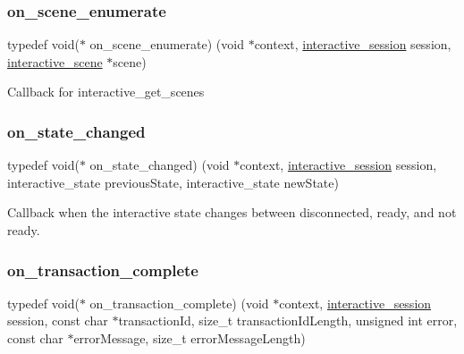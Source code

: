 \subsubsection{\texorpdfstring{on\+\_\+scene\+\_\+enumerate}{on\_scene\_enumerate}}
{\footnotesize\ttfamily typedef void($\ast$ on\+\_\+scene\+\_\+enumerate) (void $\ast$context, \mbox{\hyperlink{group___interactivity_ga6d8819d38b8dc8994a2299cf22a65a31}{interactive\+\_\+session}} session, \mbox{\hyperlink{structinteractive__scene}{interactive\+\_\+scene}} $\ast$scene)}



Callback for {\ttfamily interactive\+\_\+get\+\_\+scenes} 

\mbox{\label{group___interactivity_ga2decafcde365ca3bc6907760ef4fcc5f}} 
\subsubsection{\texorpdfstring{on\+\_\+state\+\_\+changed}{on\_state\_changed}}
{\footnotesize\ttfamily typedef void($\ast$ on\+\_\+state\+\_\+changed) (void $\ast$context, \mbox{\hyperlink{group___interactivity_ga6d8819d38b8dc8994a2299cf22a65a31}{interactive\+\_\+session}} session, interactive\+\_\+state previous\+State, interactive\+\_\+state new\+State)}



Callback when the interactive state changes between disconnected, ready, and not ready. 

\mbox{\label{group___interactivity_gadd027ab4911a031b88ecd8603ed7cbd3}} 
\subsubsection{\texorpdfstring{on\+\_\+transaction\+\_\+complete}{on\_transaction\_complete}}
{\footnotesize\ttfamily typedef void($\ast$ on\+\_\+transaction\+\_\+complete) (void $\ast$context, \mbox{\hyperlink{group___interactivity_ga6d8819d38b8dc8994a2299cf22a65a31}{interactive\+\_\+session}} session, const char $\ast$transaction\+Id, size\+\_\+t transaction\+Id\+Length, unsigned int error, const char $\ast$error\+Message, size\+\_\+t error\+Message\+Length)}



